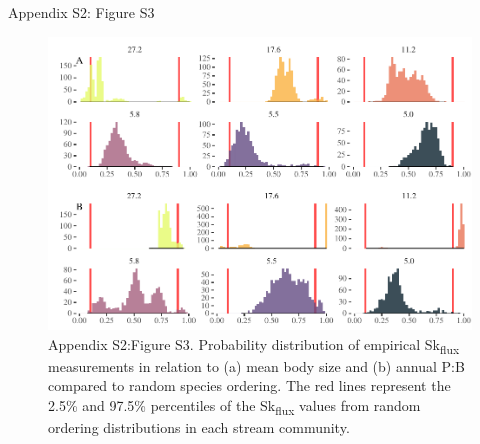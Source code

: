 \documentclass[
]{article}
\numberwithin{equation}
\begin{document}
\newpage

Appendix S2: Figure S3

\begin{figure}
\centering
\includegraphics{Junker_temp-energy-flux_appendixS2_files/figure-latex/skew distribution-1.pdf}
\caption{Appendix S2:Figure S3. Probability distribution of empirical
Sk\textsubscript{flux} measurements in relation to (a) mean body size
and (b) annual P:B compared to random species ordering. The red lines
represent the 2.5\% and 97.5\% percentiles of the Sk\textsubscript{flux}
values from random ordering distributions in each stream community.}
\end{figure}
\end{document}
